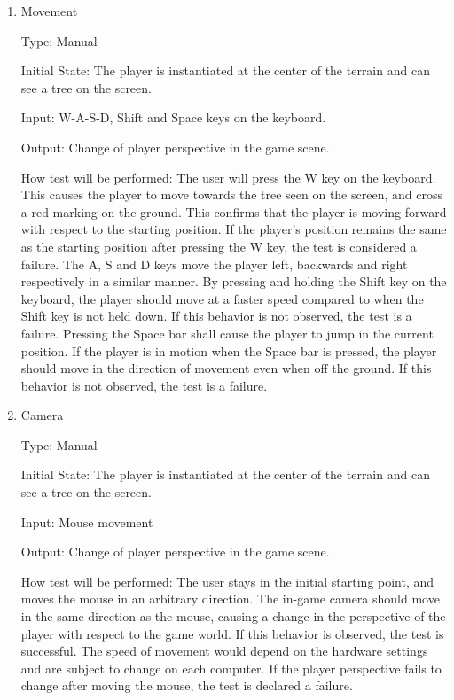 \documentclass[12pt, titlepage]{article}
\begin{document}
\begin{enumerate}

\item{Movement\\}

Type: Manual
					
Initial State: The player is instantiated at the center of the terrain and can see a tree on the screen.
					
Input: W-A-S-D, Shift and Space keys on the keyboard.
					
Output: Change of player perspective in the game scene.
					
How test will be performed:
The user will press the W key on the keyboard. This causes the player to move towards the tree seen on the screen, and cross a red marking on the ground. This confirms that the player is moving forward with respect to the starting position. If the player's position remains the same as the starting position after pressing the W key, the test is considered a failure. The A, S and D keys move the player left, backwards and right respectively in a similar manner.
\newline
By pressing and holding the Shift key on the keyboard, the player should move at a faster speed compared to when the Shift key is not held down. If this behavior is not observed, the test is a failure.\newline
Pressing the Space bar shall cause the player to jump in the current position. If the player is in motion when the Space bar is pressed, the player should move in the direction of movement even when off the ground. If this behavior is not observed, the test is a failure.
					
\item{Camera\\}

Type: Manual
					
Initial State: The player is instantiated at the center of the terrain and can see a tree on the screen.
					
Input: Mouse movement
					
Output: Change of player perspective in the game scene.
					
How test will be performed: 
The user stays in the initial starting point, and moves the mouse in an arbitrary direction. The in-game camera should move in the same direction as the mouse, causing a change in the perspective of the player with respect to the game world. If this behavior is observed, the test is successful.
\newline
The speed of movement would depend on the hardware settings and are subject to change on each computer. If the player perspective fails to change after moving the mouse, the test is declared a failure. 

\end{enumerate}
\end{document}
